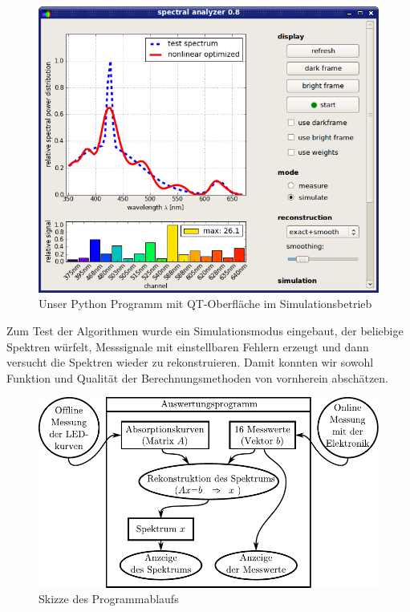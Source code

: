 \documentclass[11pt]{scrartcl}
\begin{document}
\begin{figure}[H]
\begin{center}
\includegraphics[width=1.\textwidth]{screenshot.png}
\end{center}
\vspace{-1.5\baselineskip}
\caption{Unser Python Programm mit QT-Oberfläche im Simulationsbetrieb}
\label{fig:screenshot}
\end{figure}

Zum Test der Algorithmen wurde ein Simulationsmodus eingebaut, der beliebige Spektren würfelt, Messsignale mit einstellbaren Fehlern erzeugt und dann versucht die Spektren wieder zu rekonstruieren.
Damit konnten wir sowohl Funktion und Qualität der Berechnungsmethoden von vornherein abschätzen.

\begin{figure}[ht]
\begin{center}
\includegraphics[width=1\textwidth]{programmablauf.pdf}
\end{center}
\vspace{-1.5\baselineskip}
\caption{Skizze des Programmablaufs}
\label{fig:programmablauf}
\end{figure}
\end{document}
